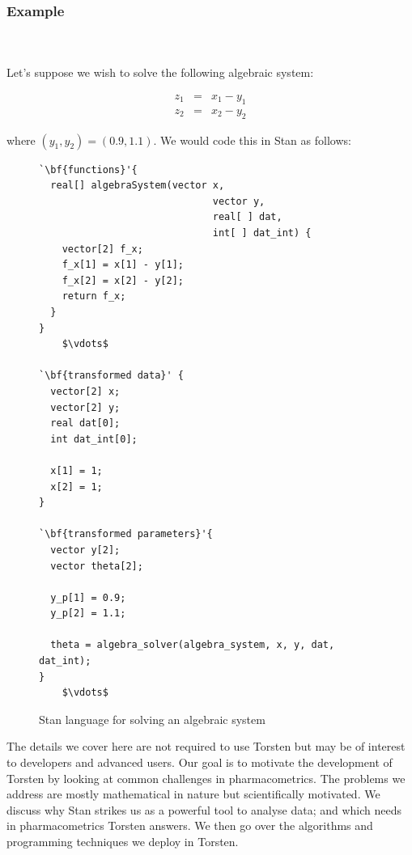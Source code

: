 \documentclass[11pt]{amsart}
\newenvironment{fmpage}[1]
     {\begin{lrbox}{\fmbox}\begin{minipage}{#1}}
     {\end{minipage}\end{lrbox}\fbox{\usebox{\fmbox}}}
\begin{document}
\subsubsection{Example} \ \\ \ \\
Let's suppose we wish to solve the following algebraic system:

\begin{eqnarray*}
  z_1 &=& x_1 - y_1  \\
  z_2 &=& x_2 - y_2
\end{eqnarray*} 

where $(y_1, y_2) = (0.9, 1.1)$. We would code this in Stan as follows:

\begin{figure}[htbp]
\caption{Stan language for solving an algebraic system}
\begin{center}
\begin{small}
\begin{fmpage}{\textwidth - .75in}
\begin{lstlisting}[basicstyle=\footnotesize\ttfamily,mathescape=true,flexiblecolumns=true,frame=single,escapeinside=`']
`\bf{functions}'{
  real[] algebraSystem(vector x,
                              vector y,
                              real[ ] dat,
                              int[ ] dat_int) {	        
    vector[2] f_x;
    f_x[1] = x[1] - y[1];
    f_x[2] = x[2] - y[2];
    return f_x;
  }
}
    $\vdots$

`\bf{transformed data}' {
  vector[2] x;
  vector[2] y;
  real dat[0];
  int dat_int[0];
  
  x[1] = 1;
  x[2] = 1;
}

`\bf{transformed parameters}'{
  vector y[2];
  vector theta[2];
  
  y_p[1] = 0.9;
  y_p[2] = 1.1;
  
  theta = algebra_solver(algebra_system, x, y, dat, dat_int);
}
    $\vdots$
\end{lstlisting}
\end{fmpage}
\end{small}
\end{center}
\label{algebraStan}
\end{figure}

\iffalse
The details we cover here are not required to use Torsten but may be of interest to developers and advanced users. Our goal is to motivate the development of Torsten by looking at common challenges in pharmacometrics. The problems we address are mostly mathematical in nature but scientifically motivated. We discuss why Stan strikes us as a powerful tool to analyse data; and which needs in pharmacometrics Torsten answers. We then go over the algorithms and programming techniques we deploy in Torsten. 
\end{document}
